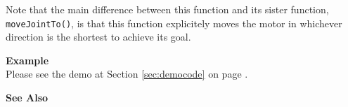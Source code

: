 Note that the main difference between this function and its sister function,
\texttt{moveJointTo()}, is that this function explicitely moves the motor in
whichever direction is the shortest to achieve its goal.

\noindent
{\bf Example}\\
Please see the demo at Section \ref{sec:democode} on page \pageref{sec:democode}.\\
\noindent

\noindent
{\bf See Also}\\

